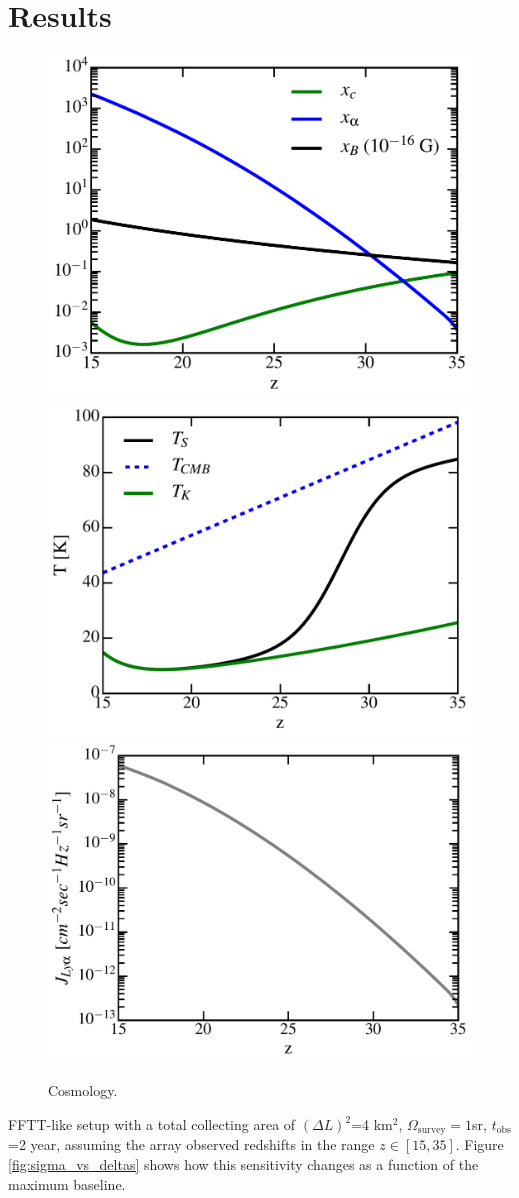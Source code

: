 \section{Results}
\label{sec:results}

\begin{figure}
\centering
\includegraphics[width=.35\textwidth,keepaspectratio=true]{xs.pdf}
\includegraphics[width=.35\textwidth,keepaspectratio=true]{Ts.pdf}
\includegraphics[width=.35\textwidth,keepaspectratio=true]{Jlya.pdf}
\caption{Cosmology.\label{fig:cosmo}}
\end{figure}
FFTT-like setup with a total collecting area of $(\Delta L)^2$=4 km$^2$, $\Omega_\text{survey}=1$sr, $t_\text{obs}$=2 year, assuming the array observed redshifts in the range $z\in [15,35]$. Figure \ref{fig:sigma_vs_deltas} shows how this sensitivity changes as a function of the maximum baseline.
